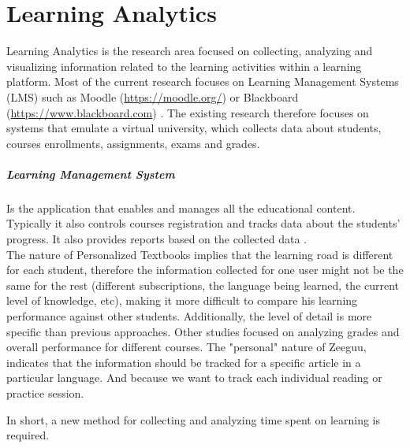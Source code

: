 \chapter{Learning Analytics}\label{ch:learning analytics}

Learning Analytics is the research area focused on collecting, analyzing and visualizing information \cite{Brown2011} related to the learning activities within a learning platform. Most of the current research focuses on Learning Management Systems (LMS) such as Moodle (\url{https://moodle.org/}) \cite{Park2015} \cite{Romero2008} or Blackboard (\url{https://www.blackboard.com}) \cite{Arnold2012}. The existing research therefore focuses on systems that emulate a virtual university, which collects data about students, courses enrollments, assignments, exams and grades.

\paragraph{Learning Management System}

Is the application that enables and manages all the educational content. Typically it also controls courses registration and tracks data about the students' progress. It also provides reports based on the collected data \cite{Watson2007}.\\


The nature of Personalized Textbooks implies that the learning road is different for each student, therefore the information collected for one user might not be the same for the rest (\Ie different subscriptions, the language being learned, the current level of knowledge, etc), making it more difficult to compare his learning performance against other students. Additionally, the level of detail is more specific than previous approaches. Other studies focused on analyzing grades and overall performance for different courses. The "personal" nature of Zeeguu, indicates that the information should be tracked for a specific article in a particular language. And because we want to track each individual reading or practice session.

In short, a new method for collecting and analyzing time spent on learning is required.


